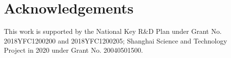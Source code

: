 \section{Acknowledgements}
\label{sec:Acknowledgement}

This work is supported by the National 
Key R\&D Plan under Grant No. 
2018YFC1200200 and 2018YFC1200205; 
Shanghai Science and Technology Project 
in 2020 under Grant No. 20040501500.